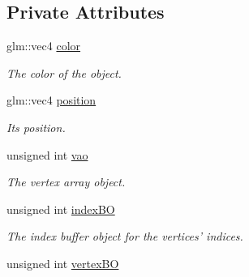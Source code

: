 \subsection*{Private Attributes}
\begin{DoxyCompactItemize}
\item 
\hypertarget{class_utility_1_1_basic_mesh_generation_1_1_torus2_d_a47dfd5cd80d535169da125f32b2d101e}{glm\-::vec4 \hyperlink{class_utility_1_1_basic_mesh_generation_1_1_torus2_d_a47dfd5cd80d535169da125f32b2d101e}{color}}\label{class_utility_1_1_basic_mesh_generation_1_1_torus2_d_a47dfd5cd80d535169da125f32b2d101e}

\begin{DoxyCompactList}\small\item\em The color of the object. \end{DoxyCompactList}\item 
\hypertarget{class_utility_1_1_basic_mesh_generation_1_1_torus2_d_a9ff1ae36f05e99296564ae7ed68dd1e2}{glm\-::vec4 \hyperlink{class_utility_1_1_basic_mesh_generation_1_1_torus2_d_a9ff1ae36f05e99296564ae7ed68dd1e2}{position}}\label{class_utility_1_1_basic_mesh_generation_1_1_torus2_d_a9ff1ae36f05e99296564ae7ed68dd1e2}

\begin{DoxyCompactList}\small\item\em Its position. \end{DoxyCompactList}\item 
\hypertarget{class_utility_1_1_basic_mesh_generation_1_1_torus2_d_ac6b9a1624d3aab8646baa4c60d250251}{unsigned int \hyperlink{class_utility_1_1_basic_mesh_generation_1_1_torus2_d_ac6b9a1624d3aab8646baa4c60d250251}{vao}}\label{class_utility_1_1_basic_mesh_generation_1_1_torus2_d_ac6b9a1624d3aab8646baa4c60d250251}

\begin{DoxyCompactList}\small\item\em The vertex array object. \end{DoxyCompactList}\item 
\hypertarget{class_utility_1_1_basic_mesh_generation_1_1_torus2_d_ae382575bad316d6002c80473bda9d645}{unsigned int \hyperlink{class_utility_1_1_basic_mesh_generation_1_1_torus2_d_ae382575bad316d6002c80473bda9d645}{index\-B\-O}}\label{class_utility_1_1_basic_mesh_generation_1_1_torus2_d_ae382575bad316d6002c80473bda9d645}

\begin{DoxyCompactList}\small\item\em The index buffer object for the vertices' indices. \end{DoxyCompactList}\item 
\hypertarget{class_utility_1_1_basic_mesh_generation_1_1_torus2_d_aaab8ca75a092cbd577f1e072e004ff08}{unsigned int \hyperlink{class_utility_1_1_basic_mesh_generation_1_1_torus2_d_aaab8ca75a092cbd577f1e072e004ff08}{vertex\-B\-O}}\label{class_utility_1_1_basic_mesh_generation_1_1_torus2_d_aaab8ca75a092cbd577f1e072e004ff08}


\end{DoxyCompactItemize}
